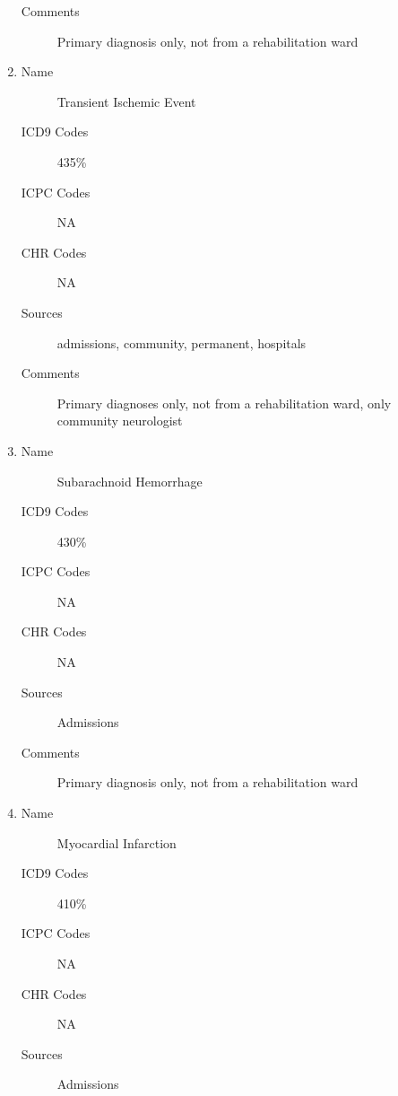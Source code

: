 \documentclass[a4paper,12pt]{article}
\begin{document}
\begin{appendices}
\begin{enumerate}
\begin{description}
   						\item[Comments] Primary diagnosis only, not from a rehabilitation ward
   					\end{description}
   					\item 
   					\begin{description}
   						\item[Name] Transient Ischemic Event
   						\item[ICD9 Codes] 435\%
   						\item[ICPC Codes] NA
   						\item[CHR Codes] NA
   						\item[Sources] admissions, community, permanent, hospitals
   						\item[Comments] Primary diagnoses only, not from a rehabilitation ward, only community neurologist
   					\end{description}
   					\item 
   					\begin{description}
   						\item[Name] Subarachnoid Hemorrhage
   						\item[ICD9 Codes] 430\%
   						\item[ICPC Codes] NA
   						\item[CHR Codes] NA
   						\item[Sources] Admissions
   						\item[Comments] Primary diagnosis only, not from a rehabilitation ward
   					\end{description}
   					\item 
   					\begin{description}
   						\item[Name] Myocardial Infarction
   						\item[ICD9 Codes] 410\%
   						\item[ICPC Codes] NA
   						\item[CHR Codes] NA
   						\item[Sources] Admissions

\end{description}
\end{enumerate}
\end{appendices}
\end{document}

